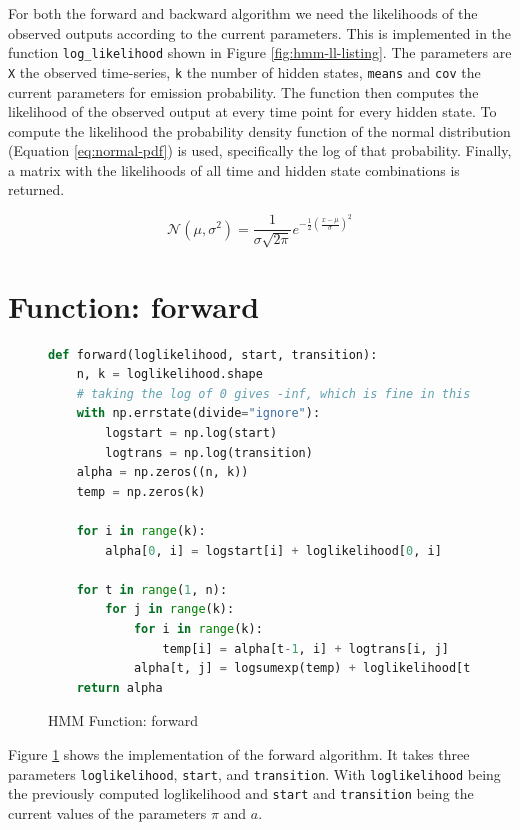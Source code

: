 For both the forward and backward algorithm we need the likelihoods of the observed outputs according to the current parameters. This is implemented in the function \texttt{log\_likelihood} shown in Figure \ref{fig:hmm-ll-listing}. The parameters are \texttt{X} the observed time-series, \texttt{k} the number of hidden states, \texttt{means} and \texttt{cov} the current parameters for emission probability. The function then computes the likelihood of the observed output at every time point for every hidden state. To compute the likelihood the probability density function of the normal distribution (Equation \eqref{eq:normal-pdf}) is used, specifically the log of that probability. Finally, a matrix with the likelihoods of all time and hidden state combinations is returned. 

\begin{equation}
  \mathcal{N}\left(\mu, \sigma^{2}\right) = \frac{1}{\sigma \sqrt{2 \pi}} e^{-\frac{1}{2}\left(\frac{x-\mu}{\sigma}\right)^{2}} 
  \label{eq:normal-pdf}
\end{equation}

\section{Function: forward}

\begin{figure}
\begin{singlespace}
\begin{lstlisting}[language=Python]
def forward(loglikelihood, start, transition):
    n, k = loglikelihood.shape
    # taking the log of 0 gives -inf, which is fine in this case
    with np.errstate(divide="ignore"):
        logstart = np.log(start)
        logtrans = np.log(transition)
    alpha = np.zeros((n, k))
    temp = np.zeros(k)

    for i in range(k):
        alpha[0, i] = logstart[i] + loglikelihood[0, i]

    for t in range(1, n):
        for j in range(k):
            for i in range(k):
                temp[i] = alpha[t-1, i] + logtrans[i, j]
            alpha[t, j] = logsumexp(temp) + loglikelihood[t, j]
    return alpha
\end{lstlisting}
\end{singlespace}
   
\caption{HMM Function: forward}    
\label{fig:hmm-forward-listing}
\end{figure}

Figure \ref{fig:hmm-forward-listing} shows the implementation of the forward algorithm. It takes three parameters \texttt{loglikelihood}, \texttt{start}, and \texttt{transition}. With \texttt{loglikelihood} being the previously computed loglikelihood and \texttt{start} and \texttt{transition} being the current values of the parameters $\pi$  and $a$.

